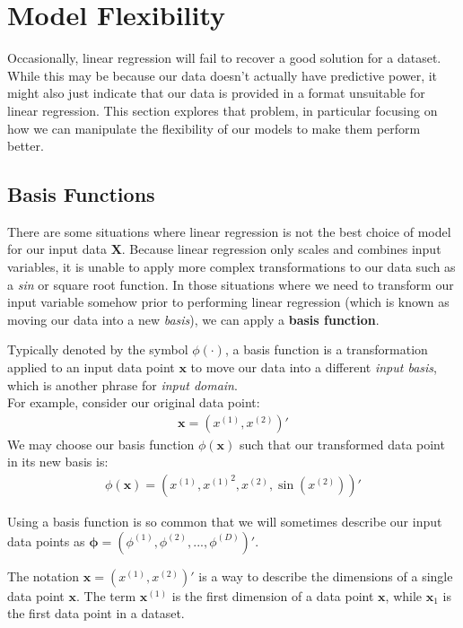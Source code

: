 \section{Model Flexibility}
Occasionally, linear regression will fail to recover a good solution for a dataset. While this may be because our data doesn't actually have predictive power, it might also just indicate that our data is provided in a format unsuitable for linear regression. This section explores that problem, in particular focusing on how we can manipulate the flexibility of our models to make them perform better.

\subsection{Basis Functions}
There are some situations where linear regression is not the best choice of model for our input data $\mathbf{X}$. Because linear regression only scales and combines input variables, it is unable to apply more complex transformations to our data such as a \textit{sin} or square root function. In those situations where we need to transform our input variable somehow prior to performing linear regression (which is known as moving our data into a new \textit{basis}), we can apply a \textbf{basis function}.

\begin{definition}
    Typically denoted by the symbol $\phi(\cdot)$, a basis function is a transformation applied to an input data point $\mathbf{x}$ to move our data into a different \textit{input basis}, which is another phrase for \textit{input domain}. \\

    For example, consider our original data point:
    \begin{align*}
    \mathbf{x} = (x^{(1)}, x^{(2)})'
    \end{align*}
    We may choose our basis function $\phi(\mathbf{x})$ such that our transformed data point in its new basis is:
    \begin{align*}
        \phi(\mathbf{x}) = (x^{(1)}, {x^{(1)}}^2, x^{(2)}, \sin(x^{(2)}))'
    \end{align*}

    Using a basis function is so common that we will sometimes describe our input data points as $\boldsymbol{\phi} = (\phi^{(1)}, \phi^{(2)}, ..., \phi^{(D)})'$.
\end{definition}

\begin{warning}
    The notation $\mathbf{x} = (x^{(1)}, x^{(2)})'$ is a way to describe the dimensions of a single data point $\mathbf{x}$. The term $\mathbf{x}^{(1)}$ is the first dimension of a data point $\mathbf{x}$, while $\mathbf{x}_1$ is the first data point in a dataset.
\end{warning}

